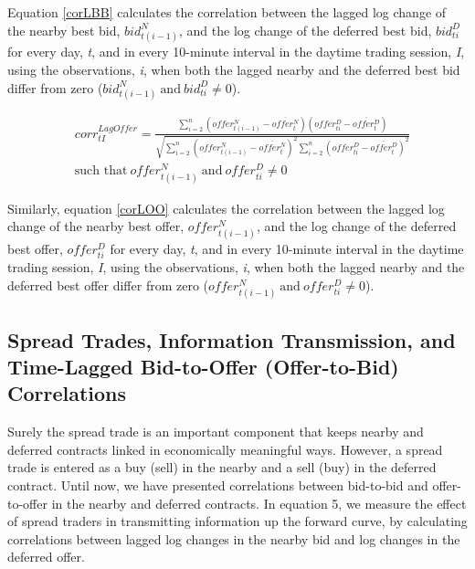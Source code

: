 \documentclass[review,12pt]{elsarticle}
\begin{document}
Equation \ref{corLBB} calculates the correlation between the lagged log
change of the nearby best bid, \(bid_{t(i-1)}^N\), and the log change of
the deferred best bid, \(bid_{ti}^D\) for every day, \emph{t}, and in
every 10-minute interval in the daytime trading session, \emph{I}, using
the observations, \emph{i}, when both the lagged nearby and the deferred
best bid differ from zero
(\({bid_{t(i-1)}^N \: \textrm{and} \: bid_{ti}^D} \neq 0\)).

\begin{equation} \label{corLOO}
\begin{split}
& corr^{LagOffer}_{tI}  = \frac{\sum\limits_{i=2}^{n} \left(offer_{t(i-1)}^N - \overline{offer_t^N}\right) \left(offer_{ti}^D - \overline{offer_t^D}\right)}{\sqrt{\sum\limits_{i=2}^{n} \left(offer_{t(i-1)}^N - \overline{offer_t^N}\right)^2 \sum\limits_{i=2}^{n}\left(offer_{ti}^D - \overline{offer_t^D}\right)^2}} \\
& \textrm{such that} \: {offer_{t(i-1)}^N \: \textrm{and} \: offer_{ti}^D} \neq 0
\end{split}
\end{equation}

Similarly, equation \ref{corLOO} calculates the correlation between the
lagged log change of the nearby best offer, \(offer_{t(i-1)}^N\), and
the log change of the deferred best offer, \(offer_{ti}^D\) for every
day, \emph{t}, and in every 10-minute interval in the daytime trading
session, \emph{I}, using the observations, \emph{i}, when both the
lagged nearby and the deferred best offer differ from zero
(\({offer_{t(i-1)}^N \: \textrm{and} \: offer_{ti}^D} \neq 0\)).

\subsection{Spread Trades, Information Transmission, and Time-Lagged
Bid-to-Offer (Offer-to-Bid)
Correlations}\label{spread-trades-information-transmission-and-time-lagged-bid-to-offer-offer-to-bid-correlations}

Surely the spread trade is an important component that keeps nearby and
deferred contracts linked in economically meaningful ways. However, a
spread trade is entered as a buy (sell) in the nearby and a sell (buy)
in the deferred contract. Until now, we have presented correlations
between bid-to-bid and offer-to-offer in the nearby and deferred
contracts. In equation 5, we measure the effect of spread traders in
transmitting information up the forward curve, by calculating
correlations between lagged log changes in the nearby bid and log
changes in the deferred offer.
\end{document}
